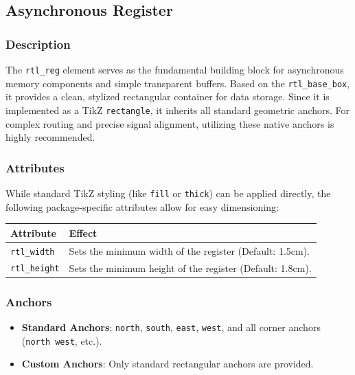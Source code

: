 
\subsection{\sffamily Asynchronous Register}

\subsubsection{\sffamily Description}
The \texttt{rtl\_reg} element serves as the fundamental building block for asynchronous memory components and simple transparent buffers. Based on the \texttt{rtl\_base\_box}, it provides a clean, stylized rectangular container for data storage. Since it is implemented as a TikZ \texttt{rectangle}, it inherits all standard geometric anchors. For complex routing and precise signal alignment, utilizing these native anchors is highly recommended.

\subsubsection{\sffamily Attributes}
While standard TikZ styling (like \texttt{fill} or \texttt{thick}) can be applied directly, the following package-specific attributes allow for easy dimensioning:

\begin{center}
	\begin{tabular}{lp{8cm}}
		\toprule
		\textbf{Attribute}   & \textbf{Effect}                                           \\
		\midrule
		\texttt{rtl\_width}  & Sets the minimum width of the register (Default: 1.5cm).  \\
		\texttt{rtl\_height} & Sets the minimum height of the register (Default: 1.8cm). \\
		\bottomrule
	\end{tabular}
\end{center}

\subsubsection{\sffamily Anchors}
\begin{itemize}
	\item \textbf{Standard Anchors}: \texttt{north}, \texttt{south}, \texttt{east}, \texttt{west}, and all corner anchors (\texttt{north west}, etc.).
	\item \textbf{Custom Anchors}: Only standard rectangular anchors are provided.
\end{itemize}

